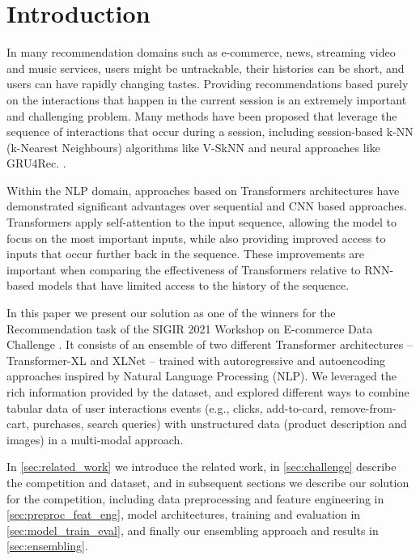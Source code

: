 \documentclass[sigconf,screen]{acmart}
\begin{document}
\maketitle

\section{Introduction}

In many recommendation domains such as e-commerce, news, streaming video and music services, users might be untrackable, their histories can be short, and users can have rapidly changing tastes\cite{tagliabue2020shopping}. Providing recommendations based purely on the interactions that happen in the current session is an extremely important and challenging problem. Many methods have been proposed that leverage the sequence of interactions that occur during a session, including session-based k-NN (k-Nearest Neighbours) algorithms like V-SkNN \cite{ludewig2018evaluation} and neural approaches like GRU4Rec. \cite{hidasi2018recurrent}. 

Within the NLP domain, approaches based on Transformers architectures \cite{vaswani2017attention} have demonstrated significant advantages over sequential and CNN based approaches.  Transformers apply self-attention to the input sequence, allowing the model to focus on the most important inputs, while also providing improved access to inputs that occur further back in the sequence. These improvements are important when comparing the effectiveness of Transformers relative to RNN-based models that have limited access to the history of the sequence. 

In this paper we present our solution as one of the winners for the Recommendation task of the SIGIR 2021 Workshop on E-commerce Data Challenge \cite{tagliabue2021sigir}. It consists of an ensemble of two different Transformer architectures -- Transformer-XL and XLNet -- trained with autoregressive and autoencoding approaches inspired by Natural Language Processing (NLP). We leveraged the rich information provided by the dataset, and explored different ways to combine tabular data of user interactions events (e.g., clicks, add-to-card, remove-from-cart, purchases, search queries) with unstructured data (product description and images) in a multi-modal approach.

In \cref{sec:related_work} we introduce the related work, in \cref{sec:challenge} describe the competition and dataset, and in subsequent sections we describe our solution for the competition, including data preprocessing and feature engineering  in \cref{sec:preproc_feat_eng}, model architectures, training and evaluation in \cref{sec:model_train_eval}, and finally our ensembling approach and results in \cref{sec:ensembling}.
\end{document}
